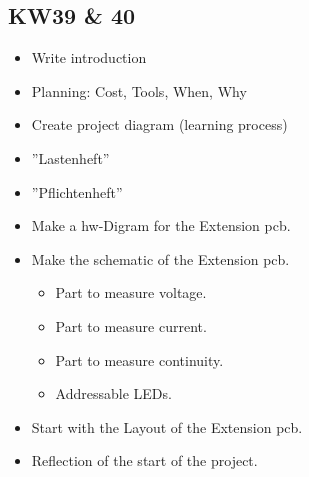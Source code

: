 \subsection{KW39 \& 40}
\begin{itemize}
    \item Write introduction
    \item Planning: Cost, Tools, When, Why
    \item Create project diagram (learning process)
    \item ''Lastenheft''
    \item ''Pflichtenheft''
    \item Make a \acs{hw}-Digram for the Extension \acs{pcb}.
    \item Make the schematic of the Extension \acs{pcb}. 
    \begin{itemize}
        \item Part to measure voltage.
        \item Part to measure current.
        \item Part to measure continuity.
        \item Addressable LEDs.
    \end{itemize}
    \item Start with the Layout of the Extension \acs{pcb}.
    \item Reflection of the start of the project.
\end{itemize}
\newpage